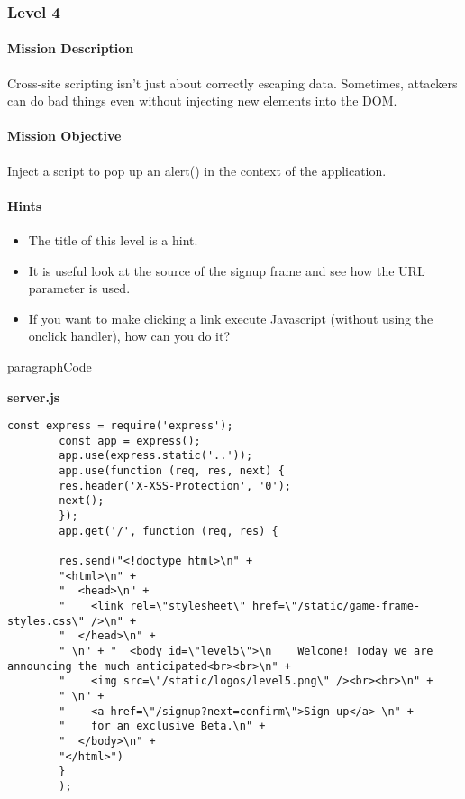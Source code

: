 \begin{Exercise}[label={websec-xss-game}]
	\subsubsection{Level 4}
		\paragraph{Mission Description}
		Cross-site scripting isn't just about correctly escaping data. Sometimes, attackers can do bad things even without injecting new elements into the DOM.
	
		\paragraph{Mission Objective}
		Inject a script to pop up an alert() in the context of the application.
		
		\paragraph{Hints}
		\begin{itemize}
			\item The title of this level is a hint.
			\item It is useful look at the source of the signup frame and see how the URL parameter is used.
			\item If you want to make clicking a link execute Javascript (without using the onclick handler), how can you do it?
		\end{itemize}
		paragraph{Code}
		
		\textbf{server.js}
		\begin{lstlisting}[style=JavaScript]
		const express = require('express');
		const app = express();
		app.use(express.static('..'));
		app.use(function (req, res, next) {
		res.header('X-XSS-Protection', '0');
		next();
		});
		app.get('/', function (req, res) {
		
		res.send("<!doctype html>\n" +
		"<html>\n" +
		"  <head>\n" +
		"    <link rel=\"stylesheet\" href=\"/static/game-frame-styles.css\" />\n" +
		"  </head>\n" +
		" \n" + "  <body id=\"level5\">\n    Welcome! Today we are announcing the much anticipated<br><br>\n" +
		"    <img src=\"/static/logos/level5.png\" /><br><br>\n" +
		" \n" +
		"    <a href=\"/signup?next=confirm\">Sign up</a> \n" +
		"    for an exclusive Beta.\n" +
		"  </body>\n" +
		"</html>")
		}
		);
		

\end{lstlisting}
\end{Exercise}
